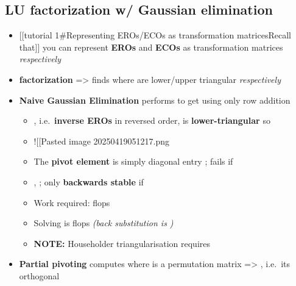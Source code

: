 \subsection*{LU factorization w/ Gaussian
  elimination}

\begin{itemize}

  \item
        {[}{[}tutorial 1\#Representing EROs/ECOs as transformation
        matrices\textbar Recall that{]}{]} you can represent \textbf{EROs} and
        \textbf{ECOs} as transformation matrices 
        \emph{respectively}
  \item
        \textbf{ factorization} =\textgreater{} finds 
        where  are lower/upper triangular \emph{respectively}
  \item
        \textbf{Naive Gaussian Elimination} performs
        \iMbox{\ds [I_{m} \ | \ A \ | \ I_{n}] \rightsquigarrow [R^{-1} \ | \ U \ | \ I_{n}]}
        to get  using only row addition

        \begin{itemize}

          \item
                , i.e.~\textbf{inverse EROs} in reversed order, is
                \textbf{lower-triangular} so 
          \item
                !{[}{[}Pasted image 20250419051217.png\textbar400{]}{]}
          \item
                The \textbf{pivot element} is simply diagonal entry
                ; fails if
          \item
                ,
                ;
                only \textbf{backwards stable} if
          \item
                Work required:  flops
          \item
                Solving  is  flops
                \emph{(back substitution is )}
          \item
                \textbf{NOTE:} Householder triangularisation requires
        \end{itemize}
  \item
        \textbf{Partial pivoting} computes  where  is
        a permutation matrix =\textgreater{} , i.e.~its
        orthogonal


\end{itemize}
